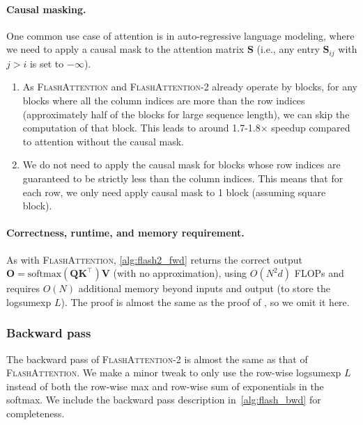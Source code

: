 \paragraph{Causal masking.}

One common use case of attention is in auto-regressive language modeling, where we need to apply a causal mask to the attention matrix $\mathbf{S}$ (i.e., any entry
$\mathbf{S}_{ij}$ with $j > i$ is set to $-\infty$).

\begin{enumerate}
  \item As \textsc{FlashAttention} and \textsc{FlashAttention-2} already operate by blocks, for any blocks where all the column indices are more than the row indices (approximately half of the blocks for large sequence length), we can skip the computation of that block. This leads to around 1.7-1.8$\times$ speedup compared to attention without the causal mask.
  \item We do not need to apply the causal mask for blocks whose row indices are guaranteed to be strictly less than the column indices. This means that for each row, we only need apply causal mask to 1 block (assuming square block).
\end{enumerate}

\paragraph{Correctness, runtime, and memory requirement.} As with \textsc{FlashAttention}, \ref{alg:flash2_fwd} returns the correct output
$\mathbf{O} = \mathrm{softmax}(\mathbf{Q}\mathbf{K}^\top)\mathbf{V}$ (with no approximation), using $O(N^2d)$ FLOPs and requires $O(N)$ additional memory beyond inputs and output (to store the logsumexp $L$). The proof is almost the same as the proof of
\citet[Theorem 1]{dao2022flashattention}, so we omit it here.

\subsubsection{Backward pass}

The backward pass of \textsc{FlashAttention-2} is almost the same as that of \textsc{FlashAttention}. We make a minor tweak to only use the row-wise logsumexp $L$ instead of both the row-wise max and row-wise sum of exponentials in the softmax. We include the backward pass description in~\ref{alg:flash_bwd} for completeness.

